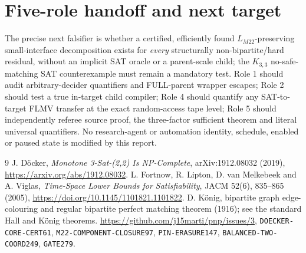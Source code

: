 \documentclass[11pt]{article}
\begin{document}
\section{Five-role handoff and next target}
The precise next falsifier is whether a certified, efficiently found $L_{M22}$-preserving small-interface decomposition exists for \emph{every} structurally non-bipartite/hard residual, without an implicit SAT oracle or a parent-scale child; the $K_{3,3}$ no-safe-matching SAT counterexample must remain a mandatory test. Role 1 should audit arbitrary-decider quantifiers and FULL-parent wrapper escapes; Role 2 should test a true in-target child compiler; Role 4 should quantify any SAT-to-target FLMV transfer at the exact random-access tape level; Role 5 should independently referee source proof, the three-factor sufficient theorem and literal universal quantifiers. No research-agent or automation identity, schedule, enabled or paused state is modified by this report.

\begin{thebibliography}{9}
 J. D\"ocker, \emph{Monotone 3-Sat-(2,2) Is NP-Complete}, arXiv:1912.08032 (2019), \url{https://arxiv.org/abs/1912.08032}.
 L. Fortnow, R. Lipton, D. van Melkebeek and A. Viglas, \emph{Time-Space Lower Bounds for Satisfiability}, JACM 52(6), 835--865 (2005), \url{https://doi.org/10.1145/1101821.1101822}.
 D. K\"onig, bipartite graph edge-colouring and regular bipartite perfect matching theorem (1916); see the standard Hall and K\"onig theorems.
 \url{https://github.com/j15marti/pnp/issues/3}, \texttt{DOECKER-CORE-CERT61}, \texttt{M22-COMPONENT-CLOSURE97}, \texttt{PIN-ERASURE147}, \texttt{BALANCED-TWO-COORD249}, \texttt{GATE279}.
\end{thebibliography}
\end{document}
